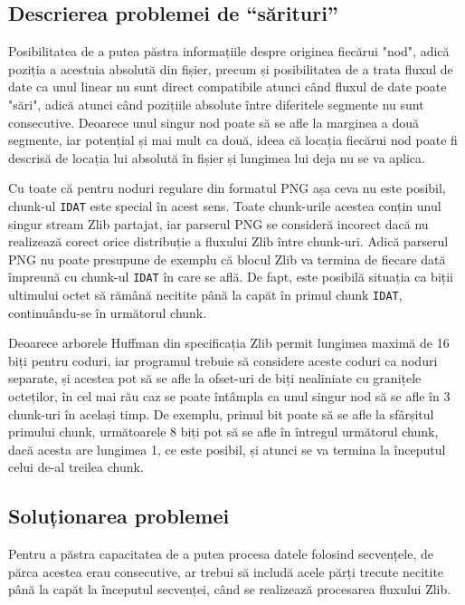 \documentclass[a4paper,12pt]{report}
\begin{document}
\subsection{Descrierea problemei de ``sărituri''}

Posibilitatea de a putea păstra informațiile despre originea fiecărui "nod",
adică poziția a acestuia absolută din fișier,
precum și posibilitatea de a trata fluxul de date ca unul linear nu sunt direct compatibile
atunci când fluxul de date poate "sări", adică atunci când pozițiile absolute
între diferitele segmente nu sunt consecutive.
Deoarece unul singur nod poate să se afle la marginea a două segmente, iar potențial și mai mult ca două,
ideea că locația fiecărui nod poate fi descrisă de locația lui absolută în fișier și
lungimea lui deja nu se va aplica.

Cu toate că pentru noduri regulare din formatul \ac{PNG} așa ceva nu este posibil,
chunk-ul \texttt{IDAT} este special în acest sens.
Toate chunk-urile acestea conțin unul singur stream Zlib partajat,
iar parserul \ac{PNG} se consideră incorect dacă nu realizează corect
orice distribuție a fluxului Zlib între chunk-uri.
Adică parserul \ac{PNG} nu poate presupune de exemplu că blocul Zlib va termina de fiecare dată
împreună cu chunk-ul \texttt{IDAT} în care se află.
De fapt, este posibilă situația ca biții ultimului octet să rămână necitite până la capăt
în primul chunk \texttt{IDAT}, continuându-se în următorul chunk.

Deoarece arborele Huffman din specificația Zlib permit lungimea maximă de 16 biți pentru coduri,
iar programul trebuie să considere aceste coduri ca noduri separate,
și acestea pot să se afle la ofset-uri de biți nealiniate cu granițele octeților,
în cel mai rău caz se poate întâmpla ca unul singur nod să se afle în 3 chunk-uri în același timp.
De exemplu, primul bit poate să se afle la sfârșitul primului chunk,
următoarele 8 biți pot să se afle în întregul următorul chunk, dacă acesta are lungimea 1, ce este posibil,
și atunci se va termina la începutul celui de-al treilea chunk.

\subsection{Soluționarea problemei}

Pentru a păstra capacitatea de a putea procesa datele folosind secvențele,
de părca acestea erau consecutive, ar trebui să includă acele părți trecute necitite până la capăt
la începutul secvenței, când se realizează procesarea fluxului Zlib.
\end{document}
